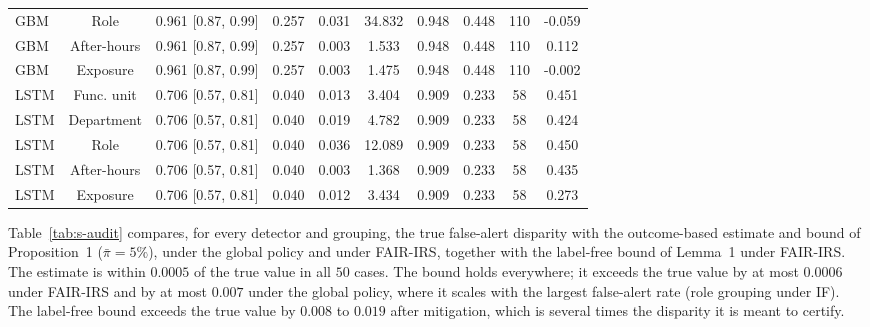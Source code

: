 \documentclass[10pt,onecolumn,letterpaper]{article}
\begin{document}
\begin{table}[!t]
{\begin{tabular}{lccccccccc}
GBM & Role & 0.961 [0.87, 0.99] & 0.257 & 0.031 & 34.832 & 0.948 & 0.448 & 110 & -0.059 \\
GBM & After-hours & 0.961 [0.87, 0.99] & 0.257 & 0.003 & 1.533 & 0.948 & 0.448 & 110 & 0.112 \\
GBM & Exposure & 0.961 [0.87, 0.99] & 0.257 & 0.003 & 1.475 & 0.948 & 0.448 & 110 & -0.002 \\
LSTM & Func. unit & 0.706 [0.57, 0.81] & 0.040 & 0.013 & 3.404 & 0.909 & 0.233 & 58 & 0.451 \\
LSTM & Department & 0.706 [0.57, 0.81] & 0.040 & 0.019 & 4.782 & 0.909 & 0.233 & 58 & 0.424 \\
LSTM & Role & 0.706 [0.57, 0.81] & 0.040 & 0.036 & 12.089 & 0.909 & 0.233 & 58 & 0.450 \\
LSTM & After-hours & 0.706 [0.57, 0.81] & 0.040 & 0.003 & 1.368 & 0.909 & 0.233 & 58 & 0.435 \\
LSTM & Exposure & 0.706 [0.57, 0.81] & 0.040 & 0.012 & 3.434 & 0.909 & 0.233 & 58 & 0.273 \\
\bottomrule
\end{tabular}}
\end{table}

Table~\ref{tab:s-audit} compares, for every detector and grouping, the true false-alert disparity with the outcome-based estimate and bound of Proposition~1 ($\bar\pi=5\%$), under the global policy and under FAIR-IRS, together with the label-free bound of Lemma~1 under FAIR-IRS. The estimate is within $0.0005$ of the true value in all $50$ cases. The bound holds everywhere; it exceeds the true value by at most $0.0006$ under FAIR-IRS and by at most $0.007$ under the global policy, where it scales with the largest false-alert rate (role grouping under IF). The label-free bound exceeds the true value by $0.008$ to $0.019$ after mitigation, which is several times the disparity it is meant to certify.
\end{document}
